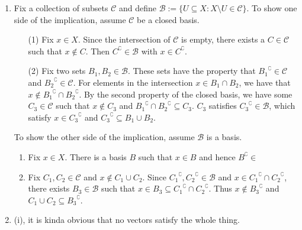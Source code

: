 \documentclass[../main.tex]{subfiles}
\begin{document}
\begin{enumerate}[label=(\alph*)]
    \item Fix a collection of subsets $\mathscr{C}$ and define $\mathscr{B} := \{U\subseteq X:X\setminus U\in\mathscr{C}\}$.
        To show one side of the implication, assume $\mathscr{C}$ be a closed basis.
        \begin{enumerate}
            \item[(1)] Fix $x \in X$.
                Since the intersection of $\mathscr{C}$ is empty, there exists a $C \in \mathscr{C}$ such that $x \notin C$.
                Then $C^\complement \in \mathscr{B}$ with $x \in C^\complement$.
            \item[(2)] Fix two sets $B_1, B_2 \in \mathscr{B}$.
                These sets have the property that ${B_1}^\complement \in \mathscr{C}$ and ${B_2}^\complement \in \mathscr{C}$.
                For elements in the intersection $x \in B_1 \cap B_2$, we have that $x \notin {B_1}^\complement \cap {B_2}^\complement$.
                By the second property of the closed basis, we have some $C_3 \in \mathscr{C}$ such that $x \notin C_3$ and ${B_1}^\complement \cap {B_2}^\complement \subseteq C_3$.
                $C_3$ satisfies ${C_3}^\complement \in \mathscr{B}$, which satisfy $x \in {C_3}^\complement$ and ${C_3}^\complement \subseteq B_1 \cup B_2$.
        \end{enumerate}
        To show the other side of the implication, assume $\mathscr{B}$ is a basis.
        \begin{enumerate}[label=(\roman*)]
            \item Fix $x \in X$. %
                There is a basis $B$ such that $x \in B$ and hence $B^\complement \in $
            \item Fix $C_1, C_2 \in \mathscr{C}$ and $x \notin C_1 \cup C_2$.
                Since ${C_1}^\complement, {C_2}^\complement \in \mathscr{B}$ and $x \in {C_1}^\complement \cap {C_2}^\complement$, there exists $B_3 \in \mathscr{B}$ such that $x \in B_3 \subseteq {C_1}^\complement \cap {C_2}^\complement$.
                Thus $x \notin {B_3}^\complement$ and $C_1 \cup C_2 \subseteq {B_3}^\complement$.
        \end{enumerate}
    \item (i), it is kinda obvious that no vectors satisfy the whole thing.
\end{enumerate}
\end{document}
